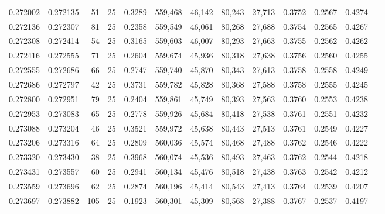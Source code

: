 \begin{tabular}{rrrrrrrrrrrrr}
0.272002 & 0.272135 &    51 &  25 &                                     0.3289 & 559,468 &  46,142 &  80,243 &  27,713 & 0.3752 & 0.2567 & 0.4274 \\
0.272136 & 0.272307 &    81 &  25 &                                     0.2358 & 559,549 &  46,061 &  80,268 &  27,688 & 0.3754 & 0.2565 & 0.4267 \\
0.272308 & 0.272414 &    54 &  25 &                                     0.3165 & 559,603 &  46,007 &  80,293 &  27,663 & 0.3755 & 0.2562 & 0.4262 \\
0.272416 & 0.272555 &    71 &  25 &                                     0.2604 & 559,674 &  45,936 &  80,318 &  27,638 & 0.3756 & 0.2560 & 0.4255 \\
0.272555 & 0.272686 &    66 &  25 &                                     0.2747 & 559,740 &  45,870 &  80,343 &  27,613 & 0.3758 & 0.2558 & 0.4249 \\
0.272686 & 0.272797 &    42 &  25 &                                     0.3731 & 559,782 &  45,828 &  80,368 &  27,588 & 0.3758 & 0.2555 & 0.4245 \\
0.272800 & 0.272951 &    79 &  25 &                                     0.2404 & 559,861 &  45,749 &  80,393 &  27,563 & 0.3760 & 0.2553 & 0.4238 \\
0.272953 & 0.273083 &    65 &  25 &                                     0.2778 & 559,926 &  45,684 &  80,418 &  27,538 & 0.3761 & 0.2551 & 0.4232 \\
0.273088 & 0.273204 &    46 &  25 &                                     0.3521 & 559,972 &  45,638 &  80,443 &  27,513 & 0.3761 & 0.2549 & 0.4227 \\
0.273206 & 0.273316 &    64 &  25 &                                     0.2809 & 560,036 &  45,574 &  80,468 &  27,488 & 0.3762 & 0.2546 & 0.4222 \\
0.273320 & 0.273430 &    38 &  25 &                                     0.3968 & 560,074 &  45,536 &  80,493 &  27,463 & 0.3762 & 0.2544 & 0.4218 \\
0.273431 & 0.273557 &    60 &  25 &                                     0.2941 & 560,134 &  45,476 &  80,518 &  27,438 & 0.3763 & 0.2542 & 0.4212 \\
0.273559 & 0.273696 &    62 &  25 &                                     0.2874 & 560,196 &  45,414 &  80,543 &  27,413 & 0.3764 & 0.2539 & 0.4207 \\
0.273697 & 0.273882 &   105 &  25 &                                     0.1923 & 560,301 &  45,309 &  80,568 &  27,388 & 0.3767 & 0.2537 & 0.4197 \\

\end{tabular}
